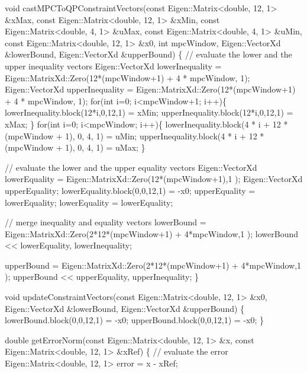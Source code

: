\begin{DoxyCodeInclude}
\textcolor{keywordtype}{void} castMPCToQPConstraintVectors(\textcolor{keyword}{const} Eigen::Matrix<double, 12, 1> &xMax, \textcolor{keyword}{const} Eigen::Matrix<double, 12,
       1> &xMin,
                                   \textcolor{keyword}{const} Eigen::Matrix<double, 4, 1> &uMax, \textcolor{keyword}{const} Eigen::Matrix<double, 4,
       1> &uMin,
                                   \textcolor{keyword}{const} Eigen::Matrix<double, 12, 1> &x0,
                                   \textcolor{keywordtype}{int} mpcWindow, Eigen::VectorXd &lowerBound, Eigen::VectorXd &upperBound)
\{
    \textcolor{comment}{// evaluate the lower and the upper inequality vectors}
    Eigen::VectorXd lowerInequality = Eigen::MatrixXd::Zero(12*(mpcWindow+1) +  4 * mpcWindow, 1);
    Eigen::VectorXd upperInequality = Eigen::MatrixXd::Zero(12*(mpcWindow+1) +  4 * mpcWindow, 1);
    \textcolor{keywordflow}{for}(\textcolor{keywordtype}{int} i=0; i<mpcWindow+1; i++)\{
        lowerInequality.block(12*i,0,12,1) = xMin;
        upperInequality.block(12*i,0,12,1) = xMax;
    \}
    \textcolor{keywordflow}{for}(\textcolor{keywordtype}{int} i=0; i<mpcWindow; i++)\{
        lowerInequality.block(4 * i + 12 * (mpcWindow + 1), 0, 4, 1) = uMin;
        upperInequality.block(4 * i + 12 * (mpcWindow + 1), 0, 4, 1) = uMax;
    \}

    \textcolor{comment}{// evaluate the lower and the upper equality vectors}
    Eigen::VectorXd lowerEquality = Eigen::MatrixXd::Zero(12*(mpcWindow+1),1 );
    Eigen::VectorXd upperEquality;
    lowerEquality.block(0,0,12,1) = -x0;
    upperEquality = lowerEquality;
    lowerEquality = lowerEquality;

    \textcolor{comment}{// merge inequality and equality vectors}
    lowerBound = Eigen::MatrixXd::Zero(2*12*(mpcWindow+1) +  4*mpcWindow,1 );
    lowerBound << lowerEquality,
        lowerInequality;

    upperBound = Eigen::MatrixXd::Zero(2*12*(mpcWindow+1) +  4*mpcWindow,1 );
    upperBound << upperEquality,
        upperInequality;
\}


\textcolor{keywordtype}{void} updateConstraintVectors(\textcolor{keyword}{const} Eigen::Matrix<double, 12, 1> &x0,
                             Eigen::VectorXd &lowerBound, Eigen::VectorXd &upperBound)
\{
    lowerBound.block(0,0,12,1) = -x0;
    upperBound.block(0,0,12,1) = -x0;
\}


\textcolor{keywordtype}{double} getErrorNorm(\textcolor{keyword}{const} Eigen::Matrix<double, 12, 1> &x,
                    \textcolor{keyword}{const} Eigen::Matrix<double, 12, 1> &xRef)
\{
    \textcolor{comment}{// evaluate the error}
    Eigen::Matrix<double, 12, 1> error = x - xRef;


\end{DoxyCodeInclude}
